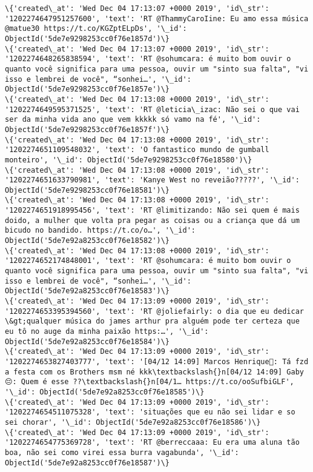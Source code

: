 \documentclass[11pt]{article}
\begin{document}
\begin{Verbatim}[commandchars=\\\{\}]
\{'created\_at': 'Wed Dec 04 17:13:07 +0000 2019', 'id\_str': '1202274647951257600', 'text': 'RT @ThammyCaroIine: Eu amo essa música @matue30 https://t.co/KGZptELpDs', '\_id': ObjectId('5de7e9298253cc0f76e1857d')\}
\{'created\_at': 'Wed Dec 04 17:13:07 +0000 2019', 'id\_str': '1202274648265838594', 'text': 'RT @sohumcara: é muito bom ouvir o quanto você significa para uma pessoa, ouvir um "sinto sua falta", "vi isso e lembrei de você", “sonhei…', '\_id': ObjectId('5de7e9298253cc0f76e1857e')\}
\{'created\_at': 'Wed Dec 04 17:13:08 +0000 2019', 'id\_str': '1202274649595371525', 'text': 'RT @leticia\_izac: Não sei o que vai ser da minha vida ano que vem kkkkk só vamo na fé', '\_id': ObjectId('5de7e9298253cc0f76e1857f')\}
\{'created\_at': 'Wed Dec 04 17:13:08 +0000 2019', 'id\_str': '1202274651109548032', 'text': 'O fantastico mundo de gumball monteiro', '\_id': ObjectId('5de7e9298253cc0f76e18580')\}
\{'created\_at': 'Wed Dec 04 17:13:08 +0000 2019', 'id\_str': '1202274651633790981', 'text': 'Kanye West no reveião?????', '\_id': ObjectId('5de7e9298253cc0f76e18581')\}
\{'created\_at': 'Wed Dec 04 17:13:08 +0000 2019', 'id\_str': '1202274651918995456', 'text': 'RT @limitizando: Não sei quem é mais doido, a mulher que volta pra pegar as coisas ou a criança que dá um bicudo no bandido. https://t.co/o…', '\_id': ObjectId('5de7e92a8253cc0f76e18582')\}
\{'created\_at': 'Wed Dec 04 17:13:08 +0000 2019', 'id\_str': '1202274652174848001', 'text': 'RT @sohumcara: é muito bom ouvir o quanto você significa para uma pessoa, ouvir um "sinto sua falta", "vi isso e lembrei de você", “sonhei…', '\_id': ObjectId('5de7e92a8253cc0f76e18583')\}
\{'created\_at': 'Wed Dec 04 17:13:09 +0000 2019', 'id\_str': '1202274653395394560', 'text': 'RT @joliefairly: o dia que eu dedicar \&gt;qualquer música do james arthur pra alguém pode ter certeza que eu tô no auge da minha paixão https:…', '\_id': ObjectId('5de7e92a8253cc0f76e18584')\}
\{'created\_at': 'Wed Dec 04 17:13:09 +0000 2019', 'id\_str': '1202274653827403777', 'text': '[04/12 14:09] Marcos Henrique💙: Tá fzd a festa com os Brothers msm né kkk\textbackslash{}n[04/12 14:09] Gaby😔: Quem é esse ??\textbackslash{}n[04/1… https://t.co/ooSufbiGLF', '\_id': ObjectId('5de7e92a8253cc0f76e18585')\}
\{'created\_at': 'Wed Dec 04 17:13:09 +0000 2019', 'id\_str': '1202274654511075328', 'text': 'situações que eu não sei lidar e so sei chorar', '\_id': ObjectId('5de7e92a8253cc0f76e18586')\}
\{'created\_at': 'Wed Dec 04 17:13:09 +0000 2019', 'id\_str': '1202274654775369728', 'text': 'RT @berreccaaa: Eu era uma aluna tão boa, não sei como virei essa burra vagabunda', '\_id': ObjectId('5de7e92a8253cc0f76e18587')\}

\end{Verbatim}
\end{document}
